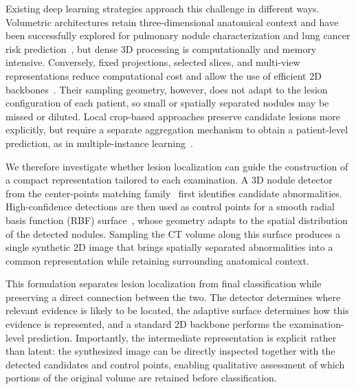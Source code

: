 \documentclass[preprint,12pt]{elsarticle}
\begin{document}
Existing deep learning strategies approach this challenge in different ways. Volumetric architectures retain three-dimensional anatomical context and have been successfully explored for pulmonary nodule characterization and lung cancer risk prediction~\cite{zhu2018deeplung,ardila2019endtoend,mikhael2023sybil}, but dense 3D processing is computationally and memory intensive. Conversely, fixed projections, selected slices, and multi-view representations reduce computational cost and allow the use of efficient 2D backbones~\cite{setio2016multiview,zheng2020mip,jang2022m3t}. Their sampling geometry, however, does not adapt to the lesion configuration of each patient, so small or spatially separated nodules may be missed or diluted. Local crop-based approaches preserve candidate lesions more explicitly, but require a separate aggregation mechanism to obtain a patient-level prediction, as in multiple-instance learning~\cite{ilse2018attention}.

We therefore investigate whether lesion localization can guide the construction of a compact representation tailored to each examination. A 3D nodule detector from the center-points matching family~\cite{song2020cpm,luo2022scpmnet} first identifies candidate abnormalities. High-confidence detections are then used as control points for a smooth radial basis function (RBF) surface~\cite{powell1987rbf}, whose geometry adapts to the spatial distribution of the detected nodules. Sampling the CT volume along this surface produces a single synthetic 2D image that brings spatially separated abnormalities into a common representation while retaining surrounding anatomical context.

This formulation separates lesion localization from final classification while preserving a direct connection between the two. The detector determines where relevant evidence is likely to be located, the adaptive surface determines how this evidence is represented, and a standard 2D backbone performs the examination-level prediction. Importantly, the intermediate representation is explicit rather than latent: the synthesized image can be directly inspected together with the detected candidates and control points, enabling qualitative assessment of which portions of the original volume are retained before classification.
\end{document}
